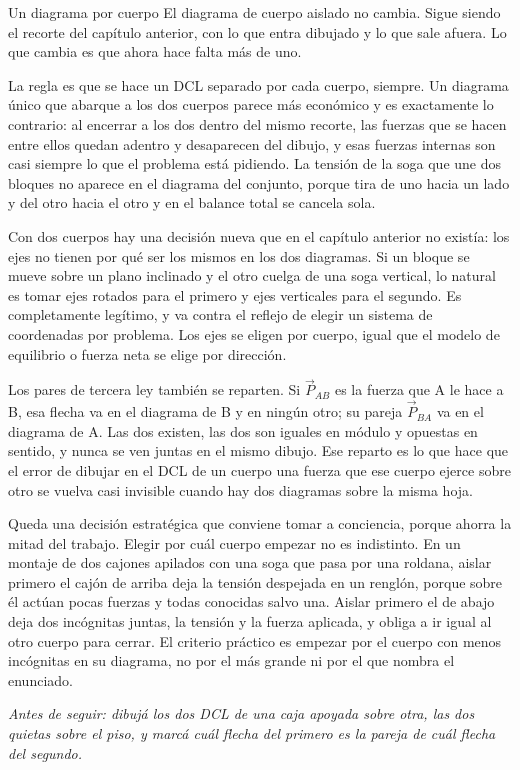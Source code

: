 \documentclass[11pt,openany]{book}
\begin{document}
\begin{bloque}{Un diagrama por cuerpo}
El diagrama de cuerpo aislado no cambia. Sigue siendo el recorte del capítulo anterior, con lo que entra dibujado y lo que sale afuera. Lo que cambia es que ahora hace falta más de uno.

La regla es que se hace un DCL separado por cada cuerpo, siempre. Un diagrama único que abarque a los dos cuerpos parece más económico y es exactamente lo contrario: al encerrar a los dos dentro del mismo recorte, las fuerzas que se hacen entre ellos quedan adentro y desaparecen del dibujo, y esas fuerzas internas son casi siempre lo que el problema está pidiendo. La tensión de la soga que une dos bloques no aparece en el diagrama del conjunto, porque tira de uno hacia un lado y del otro hacia el otro y en el balance total se cancela sola.

Con dos cuerpos hay una decisión nueva que en el capítulo anterior no existía: los ejes no tienen por qué ser los mismos en los dos diagramas. Si un bloque se mueve sobre un plano inclinado y el otro cuelga de una soga vertical, lo natural es tomar ejes rotados para el primero y ejes verticales para el segundo. Es completamente legítimo, y va contra el reflejo de elegir un sistema de coordenadas por problema. Los ejes se eligen por cuerpo, igual que el modelo de equilibrio o fuerza neta se elige por dirección.

Los pares de tercera ley también se reparten. Si $\vec P_{AB}$ es la fuerza que A le hace a B, esa flecha va en el diagrama de B y en ningún otro; su pareja $\vec P_{BA}$ va en el diagrama de A. Las dos existen, las dos son iguales en módulo y opuestas en sentido, y nunca se ven juntas en el mismo dibujo. Ese reparto es lo que hace que el error de dibujar en el DCL de un cuerpo una fuerza que ese cuerpo ejerce sobre otro se vuelva casi invisible cuando hay dos diagramas sobre la misma hoja.

Queda una decisión estratégica que conviene tomar a conciencia, porque ahorra la mitad del trabajo. Elegir por cuál cuerpo empezar no es indistinto. En un montaje de dos cajones apilados con una soga que pasa por una roldana, aislar primero el cajón de arriba deja la tensión despejada en un renglón, porque sobre él actúan pocas fuerzas y todas conocidas salvo una. Aislar primero el de abajo deja dos incógnitas juntas, la tensión y la fuerza aplicada, y obliga a ir igual al otro cuerpo para cerrar. El criterio práctico es empezar por el cuerpo con menos incógnitas en su diagrama, no por el más grande ni por el que nombra el enunciado.

\textit{Antes de seguir: dibujá los dos DCL de una caja apoyada sobre otra, las dos quietas sobre el piso, y marcá cuál flecha del primero es la pareja de cuál flecha del segundo.}
\end{bloque}
\end{document}
